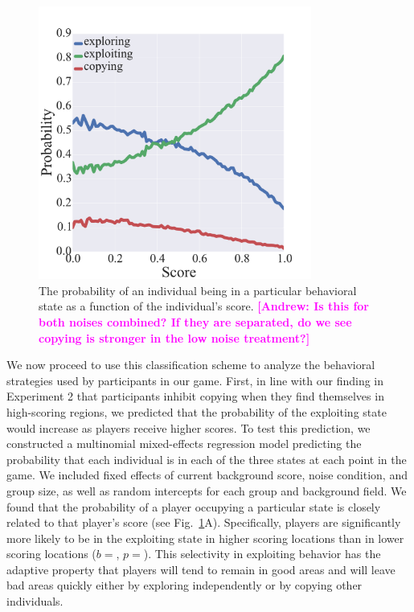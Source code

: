\documentclass[12pt,letterpaper]{article}
\newcommand{\andrew}[1]{\textcolor{magenta}{\bf [Andrew: #1]}}
\begin{document}
\begin{figure}[t!]
  \centering
  \includegraphics[width=0.8\textwidth]{./figures/states}
  \caption{The probability of an individual being in a particular
    behavioral state as a function of the individual's score. \andrew{Is this for both noises combined?  If they are separated, do we see copying is stronger in the low noise treatment?}}
  \label{fig:states}
\end{figure}

We now proceed to use this classification scheme to analyze the behavioral strategies used by participants in our game.
First, in line with our finding in Experiment 2 that participants inhibit copying when they find themselves in high-scoring regions, we predicted that the probability of the exploiting state would increase as players receive higher scores.  
To test this prediction, we constructed a multinomial mixed-effects regression model predicting the probability that each individual is in each of the three states at each point in the game. 
We included fixed effects of current background score, noise condition, and group size, as well as random intercepts for each group and background field.
We found that the probability of a player occupying a particular state is closely related to that player's score (see Fig.~\ref{fig:states}A). 
Specifically, players are significantly more likely to be in the exploiting state in higher scoring locations than in lower scoring locations ($b=$, $p=$).
This selectivity in exploiting behavior has the adaptive property that players will tend to remain in good areas and will leave bad areas quickly either by exploring independently or by copying other individuals.
\end{document}
